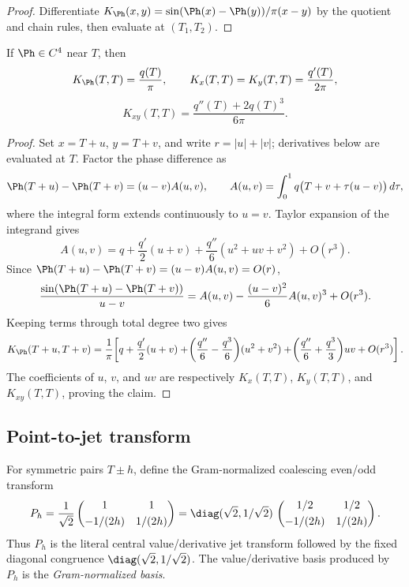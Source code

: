 \begin{proof}
Differentiate \(K_\Ph(x,y) = \sin(\Ph(x)-\Ph(y))/\pi(x-y)\) by the
quotient and chain rules, then evaluate at \((T_1, T_2)\).
\end{proof}

\begin{lemma}
\label{lem:phase-kernel-diagonal-derivatives}
If \(\Ph\in C^4\) near \(T\), then
\begin{equation}
\label{eq:diagonal-kernel-derivatives}
K_\Ph(T,T)=\frac{q(T)}{\pi},\qquad
K_x(T,T)=K_y(T,T)=\frac{q'(T)}{2\pi},
\end{equation}
\[
        K_{xy}(T,T)=\frac{q''(T)+2q(T)^3}{6\pi}.
\]
\end{lemma}

\begin{proof}
Set \(x=T+u\), \(y=T+v\), and write \(r=|u|+|v|\); derivatives below
are evaluated at \(T\).  Factor the phase difference as
\[
\Ph(T+u)-\Ph(T+v)=(u-v)A(u,v),\qquad
A(u,v)=\int_0^1 q\bigl(T+v+\tau(u-v)\bigr)\,d\tau,
\]
where the integral form extends continuously to \(u=v\).  Taylor
expansion of the integrand gives
\[
A(u,v)
= q+\frac{q'}2(u+v)+\frac{q''}{6}(u^2+uv+v^2)+O(r^3).
\]
Since \(\Ph(T+u)-\Ph(T+v)=(u-v)A(u,v)=O(r)\),
\[
\frac{\sin(\Ph(T+u)-\Ph(T+v))}{u-v}
= A(u,v)-\frac{(u-v)^2}{6}A(u,v)^3+O(r^3).
\]
Keeping terms through total degree two gives
\[
K_\Ph(T+u,T+v)
= \frac1\pi\!\left[
 q + \frac{q'}{2}(u+v)
 + \!\left(\frac{q''}{6} - \frac{q^3}{6}\right)\!(u^2+v^2)
 + \!\left(\frac{q''}{6} + \frac{q^3}{3}\right)\!uv
 + O(r^3)\right].
\]
The coefficients of \(u\), \(v\), and \(uv\) are respectively
\(K_x(T,T)\), \(K_y(T,T)\), and \(K_{xy}(T,T)\), proving the claim.
\end{proof}

\subsection{Point-to-jet transform}
\label{subsec:point-to-jet-transform}

For symmetric pairs \(T\pm h\), define the Gram-normalized coalescing
even/odd transform
\begin{equation}
\label{eq:point-to-jet-transform}
P_h
=\frac1{\sqrt2}
\begin{pmatrix}
1 & 1\\[0.6ex]
-1/(2h) & 1/(2h)
\end{pmatrix}
=\diag(\sqrt 2, 1/\sqrt 2)\,
\begin{pmatrix}
1/2 & 1/2\\[0.6ex]
-1/(2h) & 1/(2h)
\end{pmatrix}.
\end{equation}
Thus \(P_h\) is the literal central value/derivative jet transform
followed by the fixed diagonal congruence
\(\diag(\sqrt 2, 1/\sqrt 2)\).  The value/derivative basis produced by
\(P_h\) is the \emph{Gram-normalized basis}.

